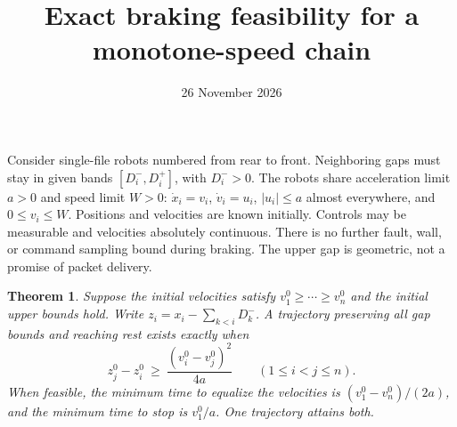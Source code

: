 \documentclass[11pt]{article}
\title{Exact braking feasibility for a monotone-speed chain}
\author{}
\date{26 November 2026}
\newtheorem{theorem}{Theorem}
\begin{document}
\maketitle

Consider single-file robots numbered from rear to front. Neighboring gaps must stay in given bands $[D_i^-,D_i^+]$, with $D_i^->0$. The robots share acceleration limit $a>0$ and speed limit $W>0$: $\dot x_i=v_i$, $\dot v_i=u_i$, $|u_i|\le a$ almost everywhere, and $0\le v_i\le W$. Positions and velocities are known initially. Controls may be measurable and velocities absolutely continuous. There is no further fault, wall, or command sampling bound during braking. The upper gap is geometric, not a promise of packet delivery.

\begin{theorem}
Suppose the initial velocities satisfy $v_1^0\ge\cdots\ge v_n^0$ and the initial upper bounds hold. Write $z_i=x_i-\sum_{k<i}D_k^-$. A trajectory preserving all gap bounds and reaching rest exists exactly when
\[
 z_j^0-z_i^0\ \ge\ \frac{(v_i^0-v_j^0)^2}{4a}
 \qquad(1\le i<j\le n).
\]
When feasible, the minimum time to equalize the velocities is $(v_1^0-v_n^0)/(2a)$, and the minimum time to stop is $v_1^0/a$. One trajectory attains both.
\end{theorem}
\end{document}
